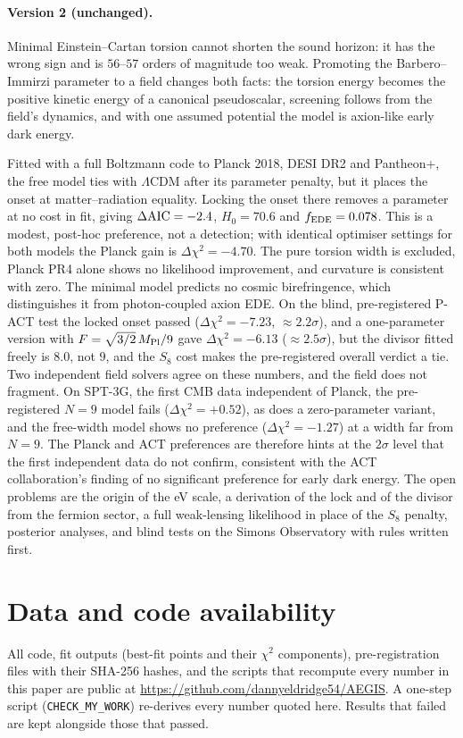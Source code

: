 \documentclass[11pt]{article}
\newcommand{\Mp}{M_{\rm Pl}}
\begin{document}
\paragraph{Version 2 (unchanged).}
Minimal Einstein--Cartan torsion cannot shorten the sound horizon: it has the wrong sign
and is $56$--$57$ orders of magnitude too weak. Promoting the Barbero--Immirzi parameter to a
field changes both facts: the torsion energy becomes the positive kinetic energy of a
canonical pseudoscalar, screening follows from the field's dynamics, and with one assumed
potential the model is axion-like early dark energy.

Fitted with a full Boltzmann code to Planck 2018, DESI DR2 and Pantheon+, the free model ties
with $\Lambda$CDM after its parameter penalty, but it places the onset at matter--radiation
equality. Locking the onset there removes a parameter at no cost in fit, giving
$\Delta{\rm AIC}=-2.4$, $H_0=70.6$ and $f_{\rm EDE}=0.078$. This is a modest, post-hoc
preference, not a detection; with identical optimiser settings for both models the Planck gain
is $\Delta\chi^2=-4.70$. The pure torsion width is excluded, Planck PR4 alone shows no
likelihood improvement, and curvature is consistent with zero. The minimal model predicts
no cosmic birefringence, which distinguishes it from photon-coupled axion EDE. On the blind,
pre-registered P-ACT test the locked onset passed ($\Delta\chi^2=-7.23$, $\approx2.2\sigma$), and a
one-parameter version with $F=\sqrt{3/2}\,\Mp/9$ gave $\Delta\chi^2=-6.13$ ($\approx2.5\sigma$), but
the divisor fitted freely is $8.0$, not $9$, and the $S_8$ cost makes the pre-registered overall
verdict a tie. Two independent field solvers agree on these numbers, and the field does not fragment.
On SPT-3G, the first CMB data independent of Planck, the pre-registered $N=9$ model fails
($\Delta\chi^2=+0.52$), as does a zero-parameter variant, and the free-width model shows no preference
($\Delta\chi^2=-1.27$) at a width far from $N=9$. The Planck and ACT preferences are therefore
hints at the $2\sigma$ level that the first independent data do not confirm, consistent with the ACT
collaboration's finding of no significant preference for early dark energy. The open problems are the
origin of the eV scale, a derivation of the lock and of the divisor from the fermion sector, a full
weak-lensing likelihood in place of the $S_8$ penalty, posterior analyses, and blind tests on the
Simons Observatory with rules written first.

\section*{Data and code availability}
All code, fit outputs (best-fit points and their $\chi^2$ components), pre-registration files
with their SHA-256 hashes, and the scripts that recompute every number in this paper are
public at \url{https://github.com/dannyeldridge54/AEGIS}. A one-step script (\texttt{CHECK\_MY\_WORK}) re-derives
every number quoted here. Results that failed are kept alongside those that passed.
\end{document}
